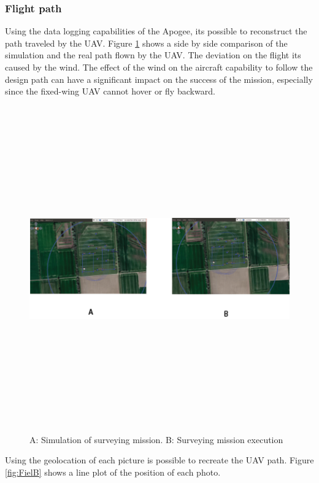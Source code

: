 \subsubsection{Flight path}
Using the data logging capabilities of the Apogee, its possible to reconstruct the path traveled by the UAV.
Figure \ref{fig:SimVReal} shows a side by side comparison of the simulation and the real path flown by the UAV. The deviation on the flight its caused by the wind. The effect of the wind on the aircraft capability to follow the design path can have a significant impact on the success of the mission, especially since the fixed-wing UAV cannot hover or fly backward. 
\begin{figure}[H]
\centering
\includegraphics[width=14cm,height=14cm,keepaspectratio]{imagenes/SimVsreallity.png}
\caption{ A: Simulation of surveying mission. B: Surveying mission execution}
\label{fig:SimVReal}
\end{figure}
Using the geolocation of each picture is possible to recreate the UAV path. Figure \ref{fig:FielB} shows a line plot of the position of each photo.
